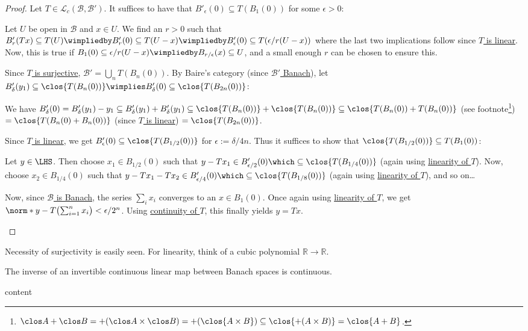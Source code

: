 	\begin{proof}
		Let $T\in\mathcal L_c(\mathscr B, \mathscr B')$. It suffices to have that $B'_\epsilon(0)\subseteq T(B_1(0))$ for some $\epsilon > 0$:
		\begin{subproof}
			Let $U$ be open in $\mathscr B$ and $x\in U$. We find an $r > 0$ such that $B'_r(Tx)\subseteq T(U)
			\wimpliedby B'_r(0)\subseteq T(U - x)
			\wimpliedby B'_\epsilon(0)\subseteq T(\epsilon/r(U - x))$
			where the last two implications follow since \uline{$T$ is linear}. Now, this is true if $B_1(0)\subseteq \epsilon/r(U - x)
			\wimpliedby B_{r/\epsilon}(x)\subseteq U$, and a small enough $r$ can be chosen to ensure this.
		\end{subproof}
		
		Since \uline{$T$ is surjective}, $\mathscr B' = \bigcup_n T(B_n(0))$. By Baire's category (since \uline{$\mathscr B'$ Banach}), let $B'_\delta(y_1)\subseteq \clos{T(B_n(0))}\wimplies B'_\delta(0)\subseteq \clos{T(B_{2n}(0))}$:
		\begin{subproof}
			We have $B'_\delta(0) = B'_\delta(y_1) - y_1
			\subseteq B'_\delta(y_1) + B'_\delta(y_1)
			\subseteq \clos{T(B_n(0))} + \clos{T(B_n(0))}
			\subseteq \clos{T(B_n(0)) + T(B_n(0))}$ (see footnote\footnote{$\clos A + \clos B 
						= +(\clos A\times\clos B)
						= +(\clos{A\times B})
						\subseteq \clos{+(A\times B)}
						= \clos{A + B}$.})
			$= \clos{T(B_n(0) + B_n(0))}$ (since \uline{$T$ is linear})
			$= \clos{T(B_{2n}(0))}$.
		\end{subproof}
		
		Since \uline{$T$ is linear}, we get $B'_{\epsilon}(0)\subseteq\clos{T(B_{1/2}(0))}$ for $\epsilon := \delta/4n$. Thus it suffices to show that $\clos{T(B_{1/2}(0))}\subseteq T(B_1(0))$:
		\begin{subproof}
			Let $y\in\LHS$. Then choose $x_1\in B_{1/2}(0)$ such that $y - Tx_1\in B'_{\epsilon/2}(0)\which\subseteq\clos{T(B_{1/4}(0))}$ (again using \uline{linearity of $T$}). Now, choose $x_2\in B_{1/4}(0)$ such that $y - Tx_1 - Tx_2\in B'_{\epsilon/4}(0)\which\subseteq\clos{T(B_{1/8}(0))}$ (again using \uline{linearity of $T$}), and so on\ldots{}
			
			Now, since \uline{$\mathscr B$ is Banach}, the series $\sum_i x_i$ converges to an $x\in B_1(0)$. Once again using \uline{linearity of $T$}, we get $\norm*{y - T\bigl(\sum_{i = 1}^n x_i\bigr)} < \epsilon/2^n$. Using \uline{continuity of $T$}, this finally yields $y = Tx$.\qedhere
		\end{subproof}
	\end{proof}
	
	\begin{rmk}
		Necessity of surjectivity is easily seen. For linearity, think of a cubic polynomial $\mathbb {R\to R}$.
	\end{rmk}
	
	\begin{cor}
		The inverse of an invertible continuous linear map between Banach spaces is continuous.
	\end{cor}
	
	\begin{rmk}
		content
	\end{rmk}